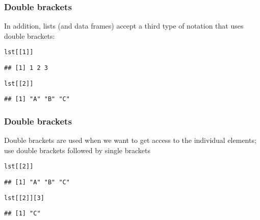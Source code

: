 \documentclass[12pt]{beamer}\usepackage[]{graphicx}\usepackage[]{color}
\makeatletter
\newcommand{\hlnum}[1]{\textcolor[rgb]{0.686,0.059,0.569}{#1}}%
\newcommand{\hlstd}[1]{\textcolor[rgb]{0.345,0.345,0.345}{#1}}%
\newenvironment{kframe}{%
 \def\at@end@of@kframe{}%
 \ifinner\ifhmode%
  \def\at@end@of@kframe{\end{minipage}}%
  \begin{minipage}{\columnwidth}%
 \fi\fi%
 \def\FrameCommand##1{\hskip\@totalleftmargin \hskip-\fboxsep
 \colorbox{shadecolor}{##1}\hskip-\fboxsep
     \hskip-\linewidth \hskip-\@totalleftmargin \hskip\columnwidth}%
 \MakeFramed {\advance\hsize-\width
   \@totalleftmargin\z@ \linewidth\hsize
   \@setminipage}}%
 {\par\unskip\endMakeFramed%
 \at@end@of@kframe}
\newenvironment{knitrout}{}{} %
\makeatother
\begin{document}

\begin{frame}[fragile]
\frametitle{Double brackets}

In addition, lists (and data frames) accept a third type of notation that uses double brackets: \code{[[ ]]}
\begin{knitrout}\footnotesize
{}\color{fgcolor}\begin{kframe}
\begin{alltt}
\hlstd{lst[[}\hlnum{1}\hlstd{]]}
\end{alltt}
\begin{verbatim}
## [1] 1 2 3
\end{verbatim}
\begin{alltt}
\hlstd{lst[[}\hlnum{2}\hlstd{]]}
\end{alltt}
\begin{verbatim}
## [1] "A" "B" "C"
\end{verbatim}
\end{kframe}
\end{knitrout}

\end{frame}


\begin{frame}[fragile]
\frametitle{Double brackets}

Double brackets are used when we want to get access to the individual elements; use double brackets followed by single brackets
\begin{knitrout}\footnotesize
{}\color{fgcolor}\begin{kframe}
\begin{alltt}
\hlstd{lst[[}\hlnum{2}\hlstd{]]}
\end{alltt}
\begin{verbatim}
## [1] "A" "B" "C"
\end{verbatim}
\begin{alltt}
\hlstd{lst[[}\hlnum{2}\hlstd{]][}\hlnum{3}\hlstd{]}
\end{alltt}
\begin{verbatim}
## [1] "C"
\end{verbatim}
\end{kframe}
\end{knitrout}

\end{frame}
\end{document}
